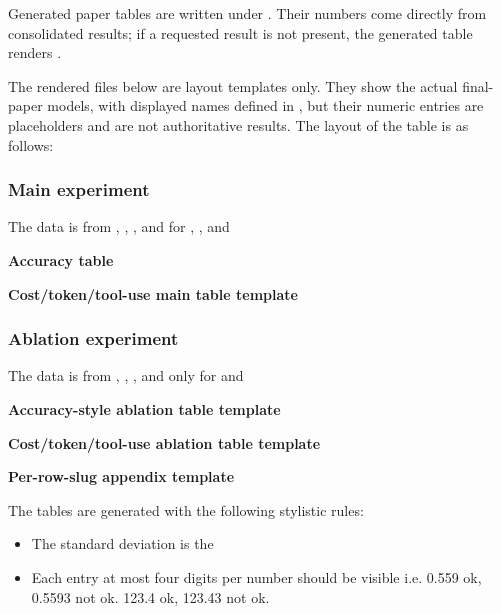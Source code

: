 \documentclass[11pt]{article}
\begin{document}
Generated paper tables are written under .
Their numbers come directly from consolidated results; if a requested result is not present, the generated table renders \code{-}.

The rendered files below are layout templates only.
They show the actual final-paper models, with displayed names defined in , but their numeric entries are placeholders and are not authoritative results.
The layout of the table is as follows:

\subsubsection*{Main experiment}
The data is from , , , and  for , ,  and 
\par
\textbf{Accuracy table}\par


\medskip
\textbf{Cost/token/tool-use main table template}\par


\subsubsection*{Ablation experiment}
The data is from , , , and  only for   and 
\medskip
\par
\textbf{Accuracy-style ablation table template}\par


\medskip
\textbf{Cost/token/tool-use ablation table template}\par


\clearpage
\textbf{Per-row-slug appendix template}\par


The tables are generated with the following stylistic rules:
\begin{itemize}
\item The standard deviation is the 
\item Each entry at most four digits per number should be visible i.e. 0.559 ok, 0.5593 not ok. 123.4 ok, 123.43 not ok.

\end{itemize}
\end{document}
